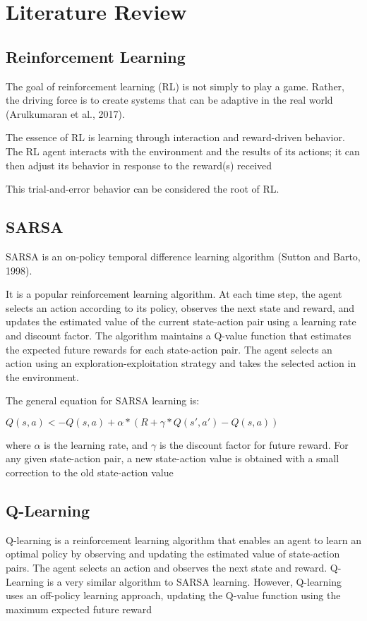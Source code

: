 \section{Literature Review}

\subsection{Reinforcement Learning}
The goal of reinforcement learning (RL) is not simply to play a game. Rather, the driving force is to create systems that can be adaptive in the real world (Arulkumaran et al., 2017).

The essence of RL is learning through interaction and reward-driven behavior. The RL agent interacts with the environment and the results of its actions; it can then adjust its behavior in
response to the reward(s) received~\citep{Arulkumaran_2017}

This trial-and-error behavior can be considered the root of RL.

\subsection{SARSA}
SARSA is an on-policy temporal difference learning algorithm (Sutton and Barto, 1998).

It is a popular reinforcement learning algorithm. At each time step, the agent selects an action according to its policy, observes the next state and reward, and updates the estimated value of the current state-action pair using a learning rate and discount factor. 
The algorithm maintains a Q-value function that estimates the expected future rewards for each state-action pair. The agent selects an action using an exploration-exploitation strategy and takes the selected action in the environment.

The general equation for SARSA learning is:

$Q(s,a) <- Q(s,a) + \alpha*(R + \gamma*Q(s',a') - Q(s,a))$

where $\alpha$ is the learning rate, and $\gamma$ is the discount factor for future reward. For any given state-action pair, a new state-action value is obtained
with a small correction to the old state-action value~\citep{graepel2004learning}

\subsection{Q-Learning}
Q-learning is a reinforcement learning algorithm that enables an agent to learn an optimal policy by observing and updating the estimated value of state-action pairs. 
The agent selects an action and observes the next state and reward.
Q-Learning is a very similar algorithm to SARSA learning. However, Q-learning uses an off-policy learning approach, updating the Q-value function using the maximum expected future reward